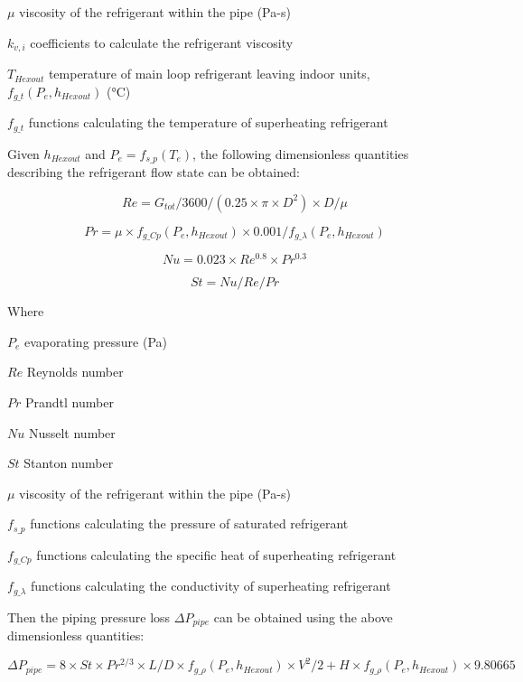 $\mu$ viscosity of the refrigerant within the pipe (Pa-s)

$k_{v,i}$	coefficients to calculate the refrigerant viscosity 

$T_{Hexout}$ temperature of main loop refrigerant leaving indoor units, $f_{g\_t}(P_e,h_{Hexout})$ (°C)

$f_{g\_t}$ functions calculating the temperature of superheating refrigerant 

Given $h_{Hexout}$ and $P_e=f_{s\_p}(T_e)$, the following dimensionless quantities describing the refrigerant flow state can be obtained:

\begin{equation}
  Re=G_{tot}/3600/(0.25\times\pi\times{D^2})\times{D}/\mu
\end{equation}

\begin{equation}
  Pr=\mu\times{f_{g\_Cp}(P_e,h_{Hexout})}\times{0.001}/f_{g\_\lambda}(P_e,h_{Hexout})
\end{equation}

\begin{equation}
  Nu=0.023\times{Re^{0.8}\times{Pr^{0.3}}}
\end{equation}

\begin{equation}
  St=Nu/Re/Pr
\end{equation}

Where

$P_e$ evaporating pressure (Pa) 

$Re$ Reynolds number 

$Pr$ Prandtl number 

$Nu$ Nusselt number 

$St$ Stanton number 

$\mu$ viscosity of the refrigerant within the pipe (Pa-s)

$f_{s\_p}$ functions calculating the pressure of saturated refrigerant 

$f_{g\_Cp}$ functions calculating the specific heat of superheating refrigerant 

$f_{g\_\lambda}$ functions calculating the conductivity of superheating refrigerant 

Then the piping pressure loss $\Delta{P_{pipe}}$ can be obtained using the above dimensionless quantities:

\begin{equation}
  \Delta{P_{pipe}}=8\times{St}\times{Pr^{2/3}}\times{L/D}\times{f_{g\_\rho}(P_e,h_{Hexout})}\times{V^2}/2+H\times{f_{g\_\rho}(P_e,h_{Hexout})}\times9.80665
\end{equation}

